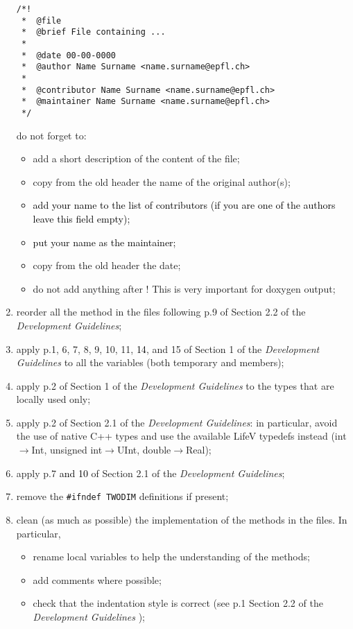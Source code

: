 \documentclass[10p]{article}
\newcommand{\newparts}[1]{\textcolor{black}{#1}}
\newcommand{\newpartsVC}[1]{\textcolor{black}{#1}}
\theoremstyle{definition}
\begin{document}
\begin{enumerate}
\begin{lstlisting}
/*!
 *  @file
 *  @brief File containing ...
 *
 *  @date 00-00-0000
 *  @author Name Surname <name.surname@epfl.ch>
 *  
 *  @contributor Name Surname <name.surname@epfl.ch>
 *  @maintainer Name Surname <name.surname@epfl.ch>
 */
\end{lstlisting}
  do not forget to:
  \begin{itemize}
	  \item add a short description of the content of the file;
	  \item copy from the old header the name of the original author(s);
	  \item \newpartsVC{add your name to the list of contributors (if you are one of the authors leave this field empty);}
	  \item \newparts{put your name as the maintainer;}
	  \item copy from the old header the date;
	  \item do not add anything after ! This is very important for doxygen output;
  \end{itemize}
  \item reorder all the method in the files following p.9 of Section 2.2 of the \emph{Development Guidelines};
  \item apply p.1, 6, 7, 8, 9, 10, 11, \newparts{14}, and 15 of Section 1 of the \emph{Development Guidelines} to all the variables (both temporary and members);
  \item apply p.2 of Section 1 of the \emph{Development Guidelines} to the types that are locally used only;
  \item apply p.2 of Section 2.1 of the \emph{Development Guidelines}: in particular, avoid the use of native C++ types and use the available LifeV typedefs instead (int$\rightarrow$Int, unsigned int$\rightarrow$UInt, double$\rightarrow$Real);
  \item apply p.7 \newpartsVC{and 10} of Section 2.1 of the \emph{Development Guidelines};
  \item remove the \texttt{\#ifndef TWODIM} definitions if present;
  \item clean (as much as possible) the implementation of the methods in the files. In particular,
  \begin{itemize}
	  \item rename local variables to help the understanding of the methods;
	  \item add comments where possible;
	  \item check that the indentation style is correct (see p.1 Section 2.2 of the \emph{Development Guidelines} );

\end{itemize}
\end{enumerate}
\end{document}
